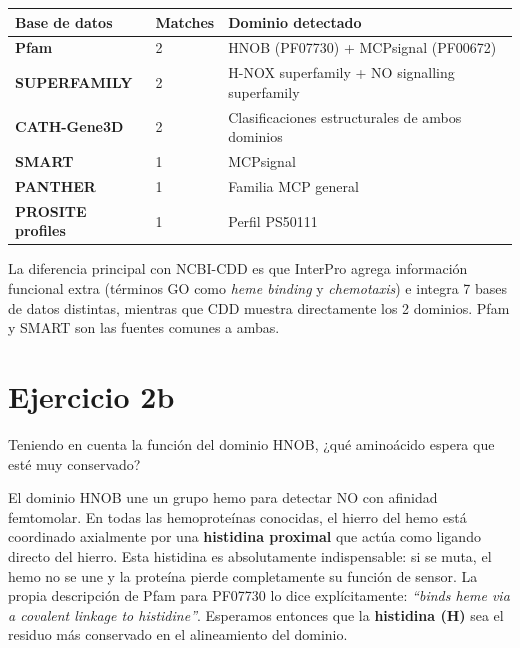 \begin{table}[H]
\centering
\footnotesize
\begin{tabular}{lP{2.5cm}P{5.5cm}}
\toprule
Base de datos & Matches & Dominio detectado \\
\midrule
\textbf{Pfam}             & 2 & HNOB (PF07730) + MCPsignal (PF00672) \\
\textbf{SUPERFAMILY}      & 2 & H-NOX superfamily + NO signalling superfamily \\
\textbf{CATH-Gene3D}      & 2 & Clasificaciones estructurales de ambos dominios \\
\textbf{SMART}            & 1 & MCPsignal \\
\textbf{PANTHER}          & 1 & Familia MCP general \\
\textbf{PROSITE profiles} & 1 & Perfil PS50111 \\
\bottomrule
\end{tabular}
\end{table}

La diferencia principal con NCBI-CDD es que InterPro agrega información funcional extra (términos
GO como \textit{heme binding} y \textit{chemotaxis}) e integra 7 bases de datos distintas, mientras
que CDD muestra directamente los 2 dominios. Pfam y SMART son las fuentes comunes a ambas.

\section{Ejercicio 2b}

\begin{consigna}
Teniendo en cuenta la función del dominio HNOB, ¿qué aminoácido espera que esté muy conservado?
\end{consigna}

El dominio HNOB une un grupo hemo para detectar NO con afinidad femtomolar. En todas las
hemoproteínas conocidas, el hierro del hemo está coordinado axialmente por una \textbf{histidina
proximal} que actúa como ligando directo del hierro. Esta histidina es absolutamente indispensable:
si se muta, el hemo no se une y la proteína pierde completamente su función de sensor. La propia
descripción de Pfam para PF07730 lo dice explícitamente: \textit{``binds heme via a covalent linkage
to histidine''}. Esperamos entonces que la \textbf{histidina (H)} sea el residuo más conservado en
el alineamiento del dominio.

